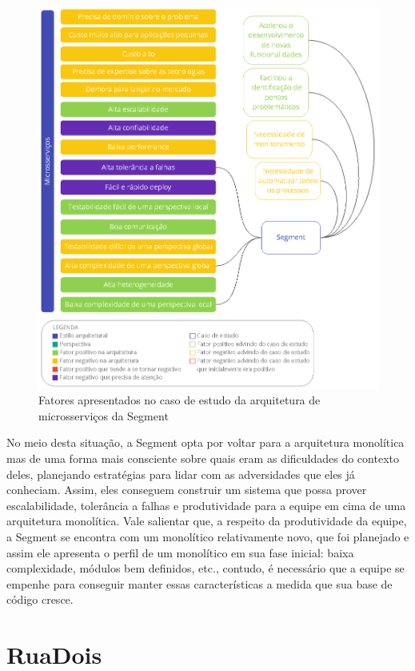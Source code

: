 \begin{figure}[h]
  \centering
  \includegraphics[keepaspectratio=true,scale=1]{figuras/analise-micro-segment.eps}
  \caption{Fatores apresentados no caso de estudo da arquitetura de microsserviços da Segment\label{fig:analise-micro-segment}}
\end{figure}

No meio desta situação, a Segment opta por voltar para a arquitetura monolítica mas de uma forma
mais consciente sobre quais eram as dificuldades do contexto deles, planejando estratégias para
lidar com as adversidades que eles já conheciam. Assim, eles conseguem construir um sistema que
possa prover escalabilidade, tolerância a falhas e produtividade para a equipe em cima de uma
arquitetura monolítica. Vale salientar que, a respeito da produtividade da equipe, a Segment se
encontra com um monolítico relativamente novo, que foi planejado e assim ele apresenta o perfil de
um monolítico em sua fase inicial: baixa complexidade, módulos bem definidos, etc., contudo, é
necessário que a equipe se empenhe para conseguir manter essas características a medida que sua base
de código cresce.

\section{RuaDois}


